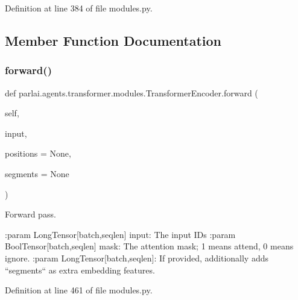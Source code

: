 Definition at line 384 of file modules.\+py.



\subsection{Member Function Documentation}
\mbox{\label{classparlai_1_1agents_1_1transformer_1_1modules_1_1TransformerEncoder_a23005871ba6683940f63511ed463266f}} 
\subsubsection{\texorpdfstring{forward()}{forward()}}
{\footnotesize\ttfamily def parlai.\+agents.\+transformer.\+modules.\+Transformer\+Encoder.\+forward (\begin{DoxyParamCaption}\item[{}]{self,  }\item[{}]{input,  }\item[{}]{positions = {\ttfamily None},  }\item[{}]{segments = {\ttfamily None} }\end{DoxyParamCaption})}

\begin{DoxyVerb}Forward pass.

:param LongTensor[batch,seqlen] input:
    The input IDs
:param BoolTensor[batch,seqlen] mask:
    The attention mask; 1 means attend, 0 means ignore.
:param LongTensor[batch,seqlen]:
    If provided, additionally adds ``segments`` as extra embedding features.
\end{DoxyVerb}
 

Definition at line 461 of file modules.\+py.



